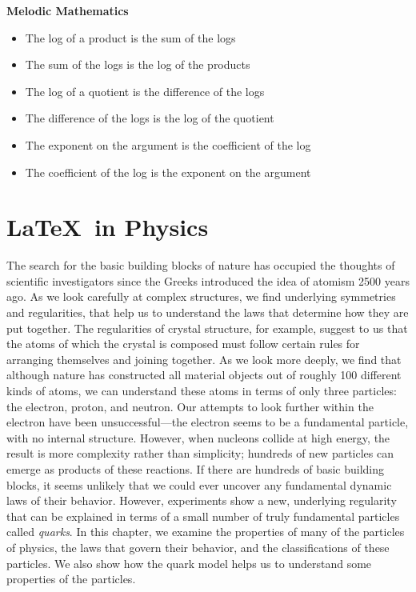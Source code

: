 \documentclass[12pt, a4paper]{article}
\begin{document}
\textbf {Melodic Mathematics}
\begin{itemize}
\item The log of a product is the sum of the logs
\item The sum of the logs is the log of the products
\item The log of a quotient is the difference of the logs
\item The difference of the logs is the log of the quotient
\item The exponent on the argument is the coefficient of the log
\item The coefficient of the log is the exponent on the argument
\end{itemize}
\pagebreak


\section*{\LaTeX\ in Physics} 
The search for the basic building blocks of nature has occupied the thoughts of
scientific investigators since the Greeks introduced the idea of atomism 2500 years
ago. As we look carefully at complex structures, we find underlying symmetries
and regularities, that help us to understand the laws that determine how they
are put together. The regularities of crystal structure, for example, suggest to us
that the atoms of which the crystal is composed must follow certain rules for
arranging themselves and joining together. As we look more deeply, we find that
although nature has constructed all material objects out of roughly 100 different
kinds of atoms, we can understand these atoms in terms of only three particles:
the electron, proton, and neutron. Our attempts to look further within the electron
have been unsuccessful—the electron seems to be a fundamental particle, with
no internal structure. However, when nucleons collide at high energy, the result
is more complexity rather than simplicity; hundreds of new particles can emerge
as products of these reactions. If there are hundreds of basic building blocks, it
seems unlikely that we could ever uncover any fundamental dynamic laws of their
behavior. However, experiments show a new, underlying regularity that can be
explained in terms of a small number of truly fundamental particles called \emph {quarks}.
In this chapter, we examine the properties of many of the particles of physics, the
laws that govern their behavior, and the classifications of these particles. We also
show how the quark model helps us to understand some properties of the particles.
\end{document}

